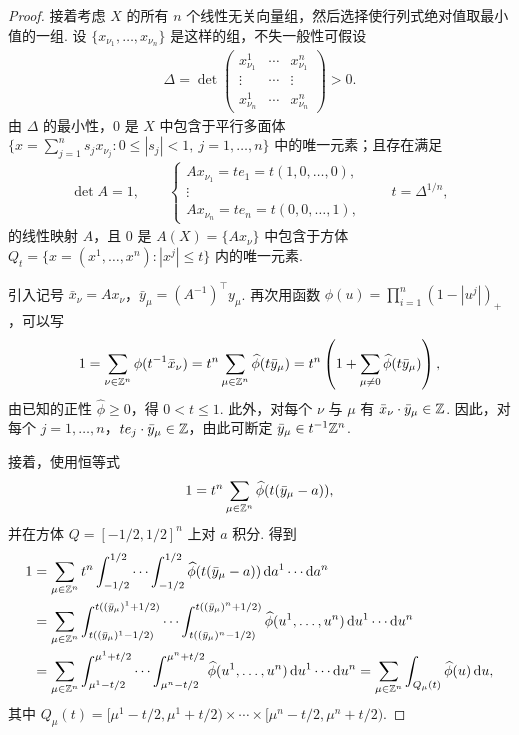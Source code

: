 \begin{proof}
接着考虑 $X$ 的所有 $n$ 个线性无关向量组，然后选择使行列式绝对值取最小值的一组. 设 $\{x_{\nu_1}, \ldots, x_{\nu_n}\}$ 是这样的组，不失一般性可假设
\begin{align*}
  \Delta=\det\begin{pmatrix}
  x^{1}_{\nu_{1}} & \cdots & x^{n}_{\nu_{1}}\\
  \vdots & \cdots & \vdots\\
  x^{1}_{\nu_{n}} & \cdots & x^{n}_{\nu_{n}}
  \end{pmatrix}>0.
\end{align*}
由 $\Delta$ 的最小性，$0$ 是 $X$ 中包含于平行多面体 $\{x = \sum_{j=1}^{n} s_j x_{\nu_j} : 0 \leq |s_j| < 1,\ j = 1, \ldots, n\}$ 中的唯一元素；且存在满足
\begin{align*}
  \det A=1,\qquad
  \begin{cases}
    A x_{\nu_{1}}=t e_{1}=t(1,0,\ldots,0),\\
    \vdots\\
    A x_{\nu_{n}}=t e_{n}=t(0,0,\ldots,1),
  \end{cases}
  \qquad t=\Delta^{1/n},
\end{align*}
的线性映射 $A$，且 $0$ 是 $A(X) = \{Ax_\nu\}$ 中包含于方体 $Q_t = \{x = (x^1, \ldots, x^n) : |x^j| \leq t\}$ 内的唯一元素.

引入记号 $\bar{x}_\nu = Ax_\nu$，$\bar{y}_\mu = (A^{-1})^\top y_\mu$. 再次用函数 $\phi(u) = \prod_{i=1}^n (1 - |u^j|)_{+}$，可以写
\begin{align*}
  1=\sum_{\nu\in\mathbb{Z}^{n}}\phi(t^{-1}\bar{x}_{\nu})
  =t^{n}\sum_{\mu\in\mathbb{Z}^{n}}\widehat{\phi}(t\bar{y}_{\mu})
  =t^{n}\left(1+\sum_{\mu\neq 0}\widehat{\phi}(t\bar{y}_{\mu})\right),
\end{align*}
由已知的正性 $\widehat{\phi} \geq 0$，得 $0 < t \leq 1$. 此外，对每个 $\nu$ 与 $\mu$ 有 $\bar{x}_{\nu}\cdot\bar{y}_{\mu} \in \mathbb{Z}$. 因此，对每个 $j = 1, \ldots, n$，$te_{j}\cdot\bar{y}_{\mu} \in \mathbb{Z}$，由此可断定 $\bar{y}_{\mu} \in t^{-1}\mathbb{Z}^{n}$.

接着，使用恒等式
\begin{align*}
  1=t^{n}\sum_{\mu\in\mathbb{Z}^{n}}\widehat{\phi}(t(\bar{y}_{\mu}-a)),
\end{align*}
并在方体 $Q = \left[-1/2, 1/2\right]^n$ 上对 $a$ 积分. 得到
\begin{align*}
  1&=\sum_{\mu\in\mathbb{Z}^{n}}t^{n}\int_{-1/2}^{1/2}\cdots\int_{-1/2}^{1/2}
   \widehat{\phi}(t(\bar{y}_\mu-a))\,\mathrm{d}a^{1}\cdots\mathrm{d}a^{n}\\
  &=\sum_{\mu\in\mathbb{Z}^{n}}\int_{t((\bar{y}_\mu)^{1}-1/2)}^{t((\bar{y}_\mu)^{1}+1/2)}\cdots
   \int_{t((\bar{y}_\mu)^{n}-1/2)}^{t((\bar{y}_\mu)^{n}+1/2)}
   \widehat{\phi}(u^{1},\ldots,u^{n})\,\mathrm{d}u^{1}\cdots\mathrm{d}u^{n}\\
  &=\sum_{\mu\in\mathbb{Z}^{n}}\int_{\mu^{1}-t/2}^{\mu^{1}+t/2}\cdots\int_{\mu^{n}-t/2}^{\mu^{n}+t/2}
   \widehat{\phi}(u^{1},\ldots,u^{n})\,\mathrm{d}u^{1}\cdots\mathrm{d}u^{n}
  =\sum_{\mu\in\mathbb{Z}^{n}}\int_{Q_\mu(t)}\widehat{\phi}(u)\,\mathrm{d}u,
\end{align*}
其中 $Q_{\mu}(t) = [\mu^1 - t/2, \mu^1 + t/2) \times \cdots \times [\mu^n - t/2, \mu^n + t/2)$.


\end{proof}
